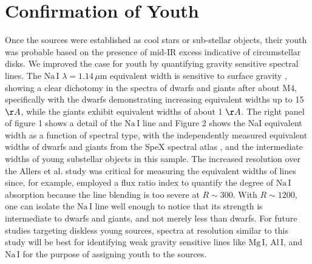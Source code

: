 \section{Confirmation of Youth}
Once the sources were established as cool stars or sub-stellar objects, their youth was probable based on the presence of mid-IR excess \citep{allers06} indicative of circumstellar disks.  We improved the case for youth by quantifying gravity sensitive spectral lines.  The $\mathrm{Na\, I}$ $\lambda=1.14 \,\mu$m equivalent width is sensitive to surface gravity \citep{rayner09}, showing a clear dichotomy in the spectra of dwarfs and giants after about M4, specifically with the dwarfs demonstrating increasing equivalent widths up to 15 $\AA$, while the giants exhibit equivalent widths of about 1 $\AA$.  The right panel of figure 1 shows a detail of the  $\mathrm{Na\, I}$ line and Figure 2 shows the NaI equivalent width as a function of spectral type, with the independently measured equivalent widths of dwarfs and giants from the SpeX spectral atlas \citep{rayner09, cushing05}, and the intermediate widths of young substellar objects in this sample.  The increased resolution over the Allers et al. \citep{allers07} study was critical for measuring the equivalent widths of lines since, for example, \citet{allers07} employed a flux ratio index to quantify the degree of $\mathrm{Na\, I}$ absorption because the line blending is too severe at $R\sim$300.  With $R\sim1200$, one can isolate the $\mathrm{Na\, I}$ line well enough to notice that its strength is intermediate to dwarfs and giants, and not merely less than dwarfs.  For future studies targeting diskless young sources, spectra at resolution similar to this study will be best for identifying weak gravity sensitive lines like $\mathrm{Mg\, I}$, $\mathrm{Al\, I}$, and $\mathrm{Na\, I}$ \citep{rayner09} for the purpose of assigning youth to the sources.  
